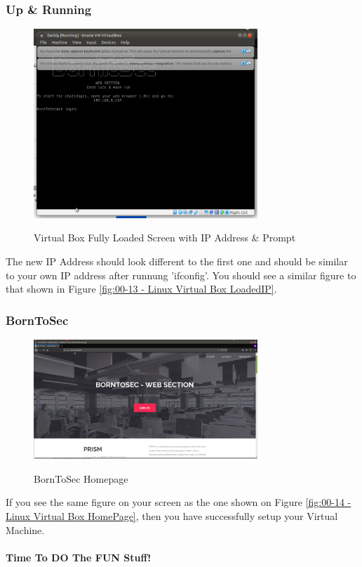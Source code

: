 \subsubsection{Up \& Running}

\begin{figure}[!htb]
    \centering
    \includegraphics[width=0.752\textwidth]{images/00-13.png}\\[0cm]  
    \caption[Virtual Box]{Virtual Box Fully Loaded Screen with IP Address \& Prompt}
    \label{fig:00-13 - Linux Virtual Box LoadedIP} 

\end{figure}
The new IP Address should look different to the first one and should be similar to
your own IP address after runnung 'ifconfig'.
You should see a similar figure to that shown in Figure \vref{fig:00-13 - Linux Virtual Box LoadedIP}.

\subsubsection{BornToSec}
\begin{figure}[!htb]
    \centering
    \includegraphics[width=0.752\textwidth]{images/00-14.png}\\[0cm]  
    \caption[Virtual Box]{BornToSec Homepage}
    \label{fig:00-14 - Linux Virtual Box HomePage} 
\end{figure}
If you see the same figure on your screen as the one shown on Figure \vref{fig:00-14 - Linux Virtual Box HomePage},
then you have successfully setup your Virtual Machine.

\paragraph{Time To DO The FUN Stuff!}

\clearpage
